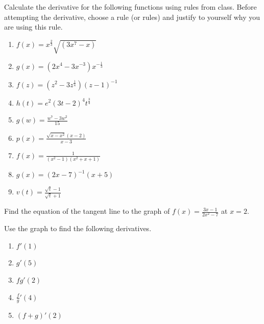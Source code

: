 \documentclass{ximera}
\begin{document}
\begin{exercise}
    Calculate the derivative for the following functions using rules from class.  Before attempting the derivative, choose a rule (or rules) and justify to yourself why you are using this rule. 
    \begin{enumerate}
        \item $f(x)=x^{\frac23}\sqrt{(3x^7-x)}$
        \item $g(x)=(2x^4-3x^{-3})x^{-\frac{1}{3}}$
        \item $f(z)=(z^2-3z^{\frac{1}{4}})(z-1)^{-1}$
        \item $h(t)=e^2(3t-2)^{4}t^{\frac{3}{4}}$
        \item $g(w)=\frac{w^7-3w^2}{15}$ \\
        \item $p(x)=\frac{\sqrt{x-x^2}(x-2)}{x-3}$    
        \item $f(x)=\frac{1}{(x^2-1)(x^2+x+1)}$
        \item $g(x)=(2x-7)^{-1}(x+5)$
        \item $v(t)=\frac{\sqrt{t}-1}{\sqrt{t}+1}$
        
    \end{enumerate}


\end{exercise}

\begin{exercise}
    Find the equation of the tangent line to the graph of $f(x)=\frac{3x-1}{2x^2-7}$ at $x=2$.
\end{exercise}


\begin{exercise}
    Use the graph to find the following derivatives.
    \begin{image}
\end{image}
    \begin{enumerate}
        \item $f'(1)$
        \item $g'(5)$
        \item $fg'(2)$
        \item $\frac{f}{g}'(4)$
        \item $(f+g)'(2)$
    \end{enumerate}
\end{exercise}
\end{document}
